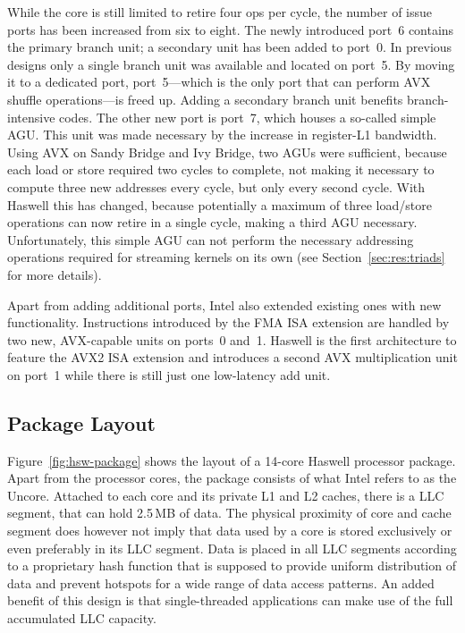 \documentclass{llncs}
\begin{document}
While the core is still limited to retire four ops per cycle, the number
of issue ports has been increased from six to eight. The newly introduced
port~6 contains the primary branch unit; a secondary unit has been added to
port~0. In previous designs only a single branch unit was available and located
on port~5.  By moving it to a dedicated port, port~5---which
is the only port that can perform AVX shuffle operations---is freed up. Adding
a secondary branch unit benefits branch-intensive codes. The other new port
is port~7, which houses a so-called simple \ac{AGU}. This unit was made
necessary by the increase in register-L1 bandwidth. Using AVX on Sandy Bridge
and Ivy Bridge, two \ac{AGU}s were sufficient, because each load or store
required two cycles to complete, not making it necessary to compute three new
addresses every cycle, but only every second cycle. With Haswell this has
changed, because potentially a maximum of three load/store operations can now
retire in a single cycle, making a third \ac{AGU} necessary. Unfortunately,
this simple \ac{AGU} can not perform the necessary addressing operations
required for streaming kernels on its own (see Section~\ref{sec:res:triads} for
more details).

Apart from adding additional ports, Intel also extended existing ones with new
functionality. Instructions introduced by the \ac{FMA} \ac{ISA} extension are
handled by two new, AVX-capable units on ports~0 and~1. Haswell is the
first architecture to feature the AVX2 ISA extension and introduces
a second \ac{AVX} multiplication unit on port~1 while there is still just one
low-latency add unit.

\subsection{Package Layout}
\label{sec:hsw:package}

Figure~\ref{fig:hsw-package} shows the layout of a 14-core Haswell processor
package. Apart from the processor cores, the package consists of what Intel
refers to as the Uncore. Attached to each core and its private L1 and L2
caches, there is a \ac{LLC} segment, that can hold 2.5\,MB of data. The
physical proximity of core and cache segment does however not imply that data
used by a core is stored exclusively or even preferably in its \ac{LLC} segment.
Data is placed in all LLC segments according to a proprietary hash function
that is supposed to provide uniform distribution of data and prevent hotspots for
a wide range of data access patterns. An added benefit of this design is that
single-threaded applications can make use of the full accumulated \ac{LLC} capacity.
\end{document}
